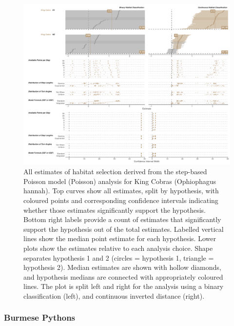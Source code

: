 \documentclass[10pt,a4paper]{article}
\begin{document}
\begin{figure}[h]
\includegraphics[width=1\linewidth]{../../figures/specCurve_King Cobra_pois} \caption{All estimates of habitat selection derived from the step-based Poisson model (Poisson) analysis for King Cobras (Ophiophagus hannah). Top curves show all estimates, split by hypothesis, with coloured points and corresponding confidence intervals indicating whether those estimates significantly support the hypothesis. Bottom right labels provide a count of estimates that significantly support the hypothesis out of the total estimates. Labelled vertical lines show the median point estimate for each hypothesis. Lower plots show the estimates relative to each analysis choice. Shape separates hypothesis 1 and 2 (circles = hypothesis 1, triangle = hypothesis 2). Median estimates are shown with hollow diamonds, and hypothesis medians are connected with appropriately coloured lines. The plot is split left and right for the analysis using a binary classification (left), and continuous inverted distance (right).}\label{fig:specCurvePoisOPHA}
\end{figure}

\subsubsection{Burmese Pythons}\label{burmese-pythons}
\end{document}

